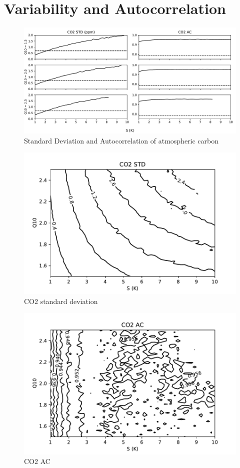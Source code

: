 \section{Variability and Autocorrelation}
\begin{figure}
  \centering
  \includegraphics[width=\textwidth]{co2_std_ac}
  \caption[Atmospheric Carbon Variability]{Standard Deviation and Autocorrelation of atmospheric carbon}
  \label{fig:co2_std_ac}
  \end{figure}
  \begin{figure}
  \centering
  \includegraphics{co2stdcontour}
  \caption{CO2 standard deviation}
  \label{fig:co2_std_Q10_S}
\end{figure}
\begin{figure}
  \centering
  \includegraphics{co2accontour}
  \caption{CO2 AC}
  \label{fig:co2_ac_Q10_S}
\end{figure}